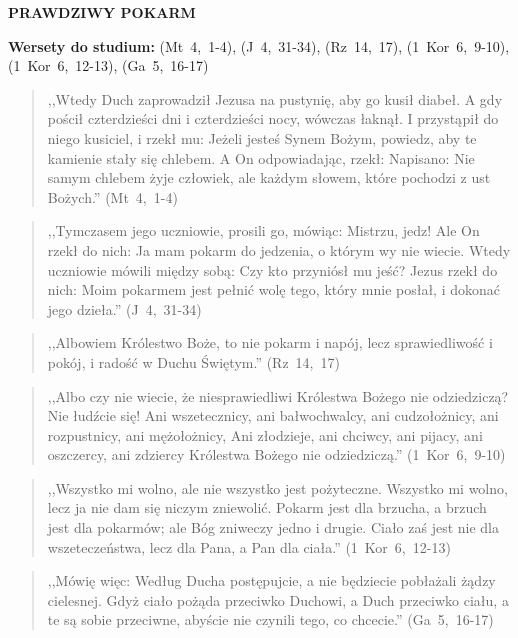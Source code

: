\documentclass[10pt,a4paper,oneside]{article}
\begin{document}
\centerline{\textbf{\MakeUppercase{Prawdziwy pokarm}}}
\begin{center}
\textbf{Wersety do studium:} \mbox{(Mt 4, 1-4)}, \mbox{(J 4, 31-34)}, \mbox{(Rz 14, 17)}, \mbox{(1 Kor 6, 9-10)}, \mbox{(1 Kor 6, 12-13)}, \mbox{(Ga 5, 16-17)}
\end{center}
\begin{quote}
,,Wtedy Duch zaprowadził Jezusa na pustynię, aby go kusił diabeł. A gdy pościł czterdzieści dni i czterdzieści nocy, wówczas łaknął. I przystąpił do niego kusiciel, i rzekł mu: Jeżeli jesteś Synem Bożym, powiedz, aby te kamienie stały się chlebem. A On odpowiadając, rzekł: Napisano: Nie samym chlebem żyje człowiek, ale każdym słowem, które pochodzi z ust Bożych.'' \mbox{(Mt 4, 1-4)}
\end{quote}
\begin{quote}
,,Tymczasem jego uczniowie, prosili go, mówiąc: Mistrzu, jedz! Ale On rzekł do nich: Ja mam pokarm do jedzenia, o którym wy nie wiecie. Wtedy uczniowie mówili między sobą: Czy kto przyniósł mu jeść? Jezus rzekł do nich: Moim pokarmem jest pełnić wolę tego, który mnie posłał, i dokonać jego dzieła.'' \mbox{(J 4, 31-34)}
\end{quote}
\begin{quote}
,,Albowiem Królestwo Boże, to nie pokarm i napój, lecz sprawiedliwość i pokój, i radość w Duchu Świętym.'' \mbox{(Rz 14, 17)}
\end{quote}
\begin{quote}
,,Albo czy nie wiecie, że niesprawiedliwi Królestwa Bożego nie odziedziczą? Nie łudźcie się! Ani wszetecznicy, ani bałwochwalcy, ani cudzołożnicy, ani rozpustnicy, ani mężołożnicy, Ani złodzieje, ani chciwcy, ani pijacy, ani oszczercy, ani zdziercy Królestwa Bożego nie odziedziczą.'' \mbox{(1 Kor 6, 9-10)}
\end{quote}
\begin{quote}
,,Wszystko mi wolno, ale nie wszystko jest pożyteczne. Wszystko mi wolno, lecz ja nie dam się niczym zniewolić. Pokarm jest dla brzucha, a brzuch jest dla pokarmów; ale Bóg zniweczy jedno i drugie. Ciało zaś jest nie dla wszeteczeństwa, lecz dla Pana, a Pan dla ciała.'' \mbox{(1 Kor 6, 12-13)}
\end{quote}
\begin{quote}
,,Mówię więc: Według Ducha postępujcie, a nie będziecie pobłażali żądzy cielesnej. Gdyż ciało pożąda przeciwko Duchowi, a Duch przeciwko ciału, a te są sobie przeciwne, abyście nie czynili tego, co chcecie.'' \mbox{(Ga 5, 16-17)}
\end{quote}
\end{document}

